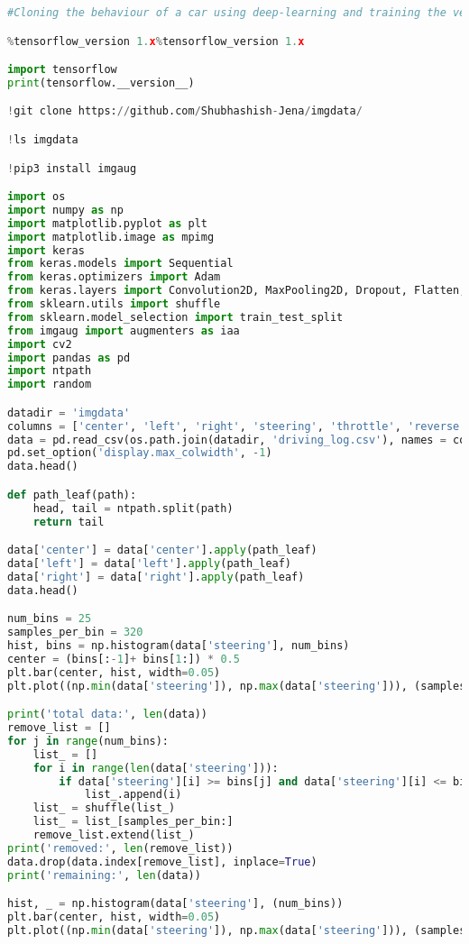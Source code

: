 \begin{lstlisting}[language=Python]
#Cloning the behaviour of a car using deep-learning and training the vehicle to run autonomously on a track.

%tensorflow_version 1.x%tensorflow_version 1.x

import tensorflow
print(tensorflow.__version__)

!git clone https://github.com/Shubhashish-Jena/imgdata/

!ls imgdata

!pip3 install imgaug

import os
import numpy as np
import matplotlib.pyplot as plt
import matplotlib.image as mpimg
import keras
from keras.models import Sequential
from keras.optimizers import Adam
from keras.layers import Convolution2D, MaxPooling2D, Dropout, Flatten, Dense
from sklearn.utils import shuffle
from sklearn.model_selection import train_test_split
from imgaug import augmenters as iaa
import cv2
import pandas as pd
import ntpath
import random

datadir = 'imgdata'
columns = ['center', 'left', 'right', 'steering', 'throttle', 'reverse', 'speed']
data = pd.read_csv(os.path.join(datadir, 'driving_log.csv'), names = columns)
pd.set_option('display.max_colwidth', -1)
data.head()

def path_leaf(path):
	head, tail = ntpath.split(path)
	return tail

data['center'] = data['center'].apply(path_leaf)
data['left'] = data['left'].apply(path_leaf)
data['right'] = data['right'].apply(path_leaf)
data.head()

num_bins = 25
samples_per_bin = 320
hist, bins = np.histogram(data['steering'], num_bins)
center = (bins[:-1]+ bins[1:]) * 0.5
plt.bar(center, hist, width=0.05)
plt.plot((np.min(data['steering']), np.max(data['steering'])), (samples_per_bin, samples_per_bin))

print('total data:', len(data))
remove_list = []
for j in range(num_bins):
	list_ = []
	for i in range(len(data['steering'])):
		if data['steering'][i] >= bins[j] and data['steering'][i] <= bins[j+1]:
			list_.append(i)
	list_ = shuffle(list_)
	list_ = list_[samples_per_bin:]
	remove_list.extend(list_)
print('removed:', len(remove_list))
data.drop(data.index[remove_list], inplace=True)
print('remaining:', len(data))

hist, _ = np.histogram(data['steering'], (num_bins))
plt.bar(center, hist, width=0.05)
plt.plot((np.min(data['steering']), np.max(data['steering'])), (samples_per_bin, samples_per_bin))


\end{lstlisting}
